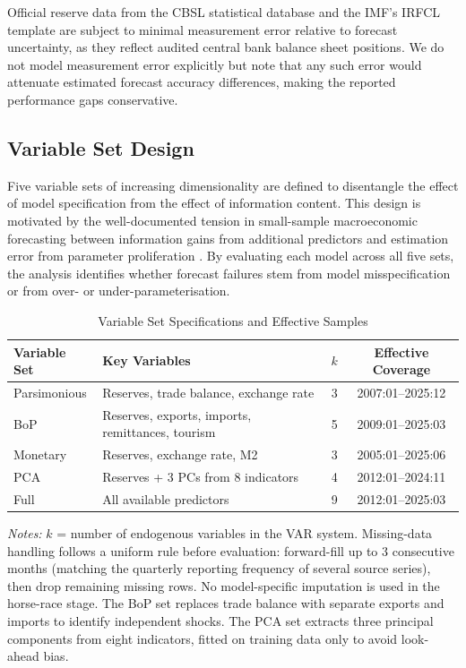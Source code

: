 \documentclass[12pt,a4paper]{article}
\begin{document}
Official reserve data from the CBSL statistical database and the IMF's IRFCL template are subject to minimal measurement error relative to forecast uncertainty, as they reflect audited central bank balance sheet positions. We do not model measurement error explicitly but note that any such error would attenuate estimated forecast accuracy differences, making the reported performance gaps conservative.

\subsection{Variable Set Design}

Five variable sets of increasing dimensionality are defined to disentangle the effect of model specification from the effect of information content. This design is motivated by the well-documented tension in small-sample macroeconomic forecasting between information gains from additional predictors and estimation error from parameter proliferation \citep{Banbura2010,Carriero2015}. By evaluating each model across all five sets, the analysis identifies whether forecast failures stem from model misspecification or from over- or under-parameterisation.

\begin{table}[htbp]
\centering
\caption{Variable Set Specifications and Effective Samples}
\label{tab:varsets}
\begin{tabular}{llcc}
\toprule
Variable Set & Key Variables & $k$ & Effective Coverage \\
\midrule
Parsimonious & Reserves, trade balance, exchange rate & 3 & 2007:01--2025:12 \\
BoP & Reserves, exports, imports, remittances, tourism & 5 & 2009:01--2025:03 \\
Monetary & Reserves, exchange rate, M2 & 3 & 2005:01--2025:06 \\
PCA & Reserves + 3 PCs from 8 indicators & 4 & 2012:01--2024:11 \\
Full & All available predictors & 9 & 2012:01--2025:03 \\
\bottomrule
\end{tabular}
\begin{tablenotes}
\small
\item \textit{Notes:} $k$ = number of endogenous variables in the VAR system. Missing-data handling follows a uniform rule before evaluation: forward-fill up to 3 consecutive months (matching the quarterly reporting frequency of several source series), then drop remaining missing rows. No model-specific imputation is used in the horse-race stage. The BoP set replaces trade balance with separate exports and imports to identify independent shocks. The PCA set extracts three principal components from eight indicators, fitted on training data only to avoid look-ahead bias.
\end{tablenotes}
\end{table}
\end{document}
